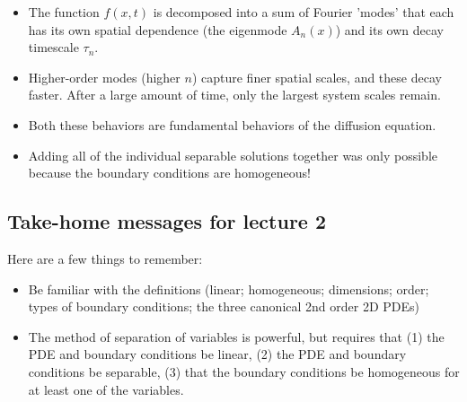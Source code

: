 \begin{itemize}
    \item The function $f(x,t)$ is decomposed into a sum of Fourier 'modes' that each has its own spatial dependence (the eigenmode $A_n(x)$) and its own decay timescale $\tau_n$. 
    \item Higher-order modes (higher $n$)  capture finer spatial scales, and these decay faster. After a large amount of time, only the largest system scales remain.  
    \item Both these behaviors are fundamental behaviors of the diffusion equation.
    \item Adding all of the individual separable solutions together was only possible because the boundary conditions are homogeneous!
\end{itemize}

\subsection{Take-home messages for lecture 2}

Here are a few things to remember:
\begin{itemize}
    \item Be familiar with the definitions (linear; homogeneous; dimensions; order; types of boundary conditions; the three canonical 2nd order 2D PDEs)
    \item The method of separation of variables is powerful, but requires that (1) the PDE and boundary conditions be linear, (2) the PDE and boundary conditions be separable, (3) that the boundary conditions be homogeneous for at least one of the variables. 
\end{itemize}